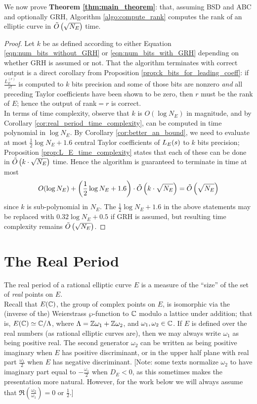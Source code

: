 We now prove {\bf Theorem \ref{thm:main_theorem}}: that, assuming BSD and ABC and optionally GRH, Algorithm \ref{algo:compute_rank} computes the rank of an elliptic curve in $\tilde{O}\left(\sqrt{N_E}\right)$ time.
\begin{proof}
Let $k$ be as defined according to either Equation \ref{eqn:num_bits_without_GRH} or \ref{eqn:num_bits_with_GRH} depending on whether GRH is assumed or not. That the algorithm terminates with correct output is a direct corollary from Proposition \ref{prop:k_bits_for_leading_coeff}: if $\frac{L_E^{(r)}}{r!}$ is computed to $k$ bits precision and some of those bits are nonzero {\it and} all preceding Taylor coefficients have been shown to be zero, then $r$ must be the rank of $E$; hence the output of rank$=r$ is correct. \\

In terms of time complexity, observe that $k$ is $O(\log N_E)$ in magnitude, and by Corollary \ref{cor:real_period_time_complexity}, can be computed in time polynomial in $\log N_E$. By Corollary \ref{cor:better_an_bound}, we need to evaluate at most $\frac{1}{2}\log N_E +1.6$ central Taylor coefficients of $L_E(s)$ to $k$ bits precision; Proposition \ref{prop:L_E_time_complexity} states that each of these can be done in $\tilde{O}\left(k\cdot \sqrt{N_E}\right)$ time. Hence the algorithm is guaranteed to terminate in time at most 
\begin{equation}
O(\log N_E) + \left(\frac{1}{2}\log N_E + 1.6\right) \cdot \tilde{O}\left(k\cdot \sqrt{N_E}\right) = \tilde{O}\left(\sqrt{N_E}\right)
\end{equation}
since $k$ is sub-polynomial in $N_E$. The $\frac{1}{2}\log N_E + 1.6$ in the above statements may be replaced with $0.32\log N_E + 0.5$ if GRH is assumed, but resulting time complexity remains $\tilde{O}\left(\sqrt{N_E}\right)$.
\end{proof}


\newpage
\section{The Real Period}

The real period of a rational elliptic curve $E$ is a measure of the ``size'' of the set of {\it real} points on $E$. \\

Recall that $E(\mathbb{C})$, the group of complex points on $E$, is isomorphic via the (inverse of the) Weierstrass $\wp$-function to $\mathbb{C}$ modulo a lattice under addition; that is, $E(\mathbb{C}) \simeq \mathbb{C}/\Lambda$, where $\Lambda = \mathbb{Z}\omega_1 + \mathbb{Z}\omega_2$, and $\omega_1,\omega_2 \in \mathbb{C}$.
If $E$ is defined over the real numbers (as rational elliptic curves are), then we may always write $\omega_1$ as being positive real. The second generator $\omega_2$ can be written as being positive imaginary when $E$ has positive discriminant, or in the upper half plane with real part $\frac{\omega_1}{2}$ when $E$ has negative discriminant. [Note: some texts normalize $\omega_2$ to have imaginary part equal to $-\frac{\omega_1}{2}$ when $D_E<0$, as this sometimes makes the presentation more natural. However, for the work below we will always assume that $\Re(\frac{\omega_2}{\omega_1}) = 0$ or $\frac{1}{2}$.]

